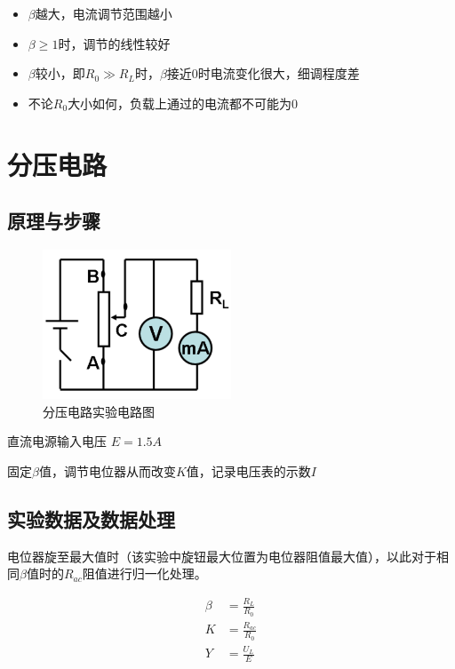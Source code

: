 \documentclass{article}
\begin{document}
\begin{itemize}
    \item $\beta$越大，电流调节范围越小
    \item $\beta \geq 1$时，调节的线性较好
    \item $\beta$较小，即$R_0 \gg R_L$时，$\beta$接近0时电流变化很大，细调程度差
    \item 不论$R_0$大小如何，负载上通过的电流都不可能为0
\end{itemize}

\section{分压电路}
\subsection{原理与步骤}

\begin{figure}[htbp]
    \centering
    \includegraphics[width=0.5\textwidth]{voltage-control.png}
    \caption{分压电路实验电路图}
\end{figure}

直流电源输入电压 $E = 1.5 A$

固定$\beta$值，调节电位器从而改变$K$值，记录电压表的示数$I$

\subsection{实验数据及数据处理}
电位器旋至最大值时（该实验中旋钮最大位置为电位器阻值最大值），以此对于相同$\beta$值时的$R_{ac}$阻值进行归一化处理。

\begin{align*}
    \beta &= \frac{R_L}{R_0} \\
    K &= \frac{R_{ac}}{R_0} \\
    Y &= \frac{U_{L}}{E}
\end{align*}
\end{document}
